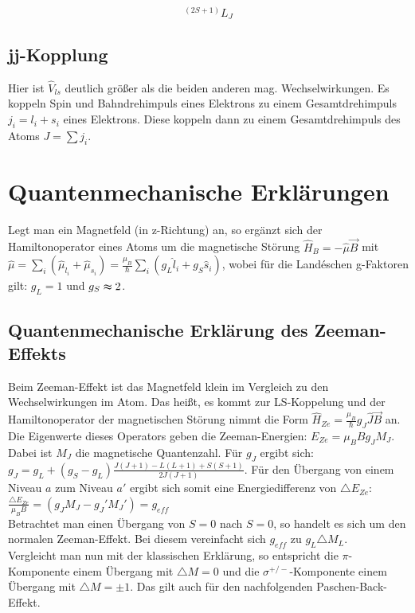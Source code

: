 \documentclass[bigchapter,colorback,accentcolor=tud4b,linedtoc,11pt]{tudreport}
\begin{document}
$$^{(2S+1)}L_{J}$$



\subsection{jj-Kopplung}

Hier ist $\hat{V}_{ls}$ deutlich größer als die beiden anderen mag.
Wechselwirkungen. Es koppeln Spin und Bahndrehimpuls eines Elektrons
zu einem Gesamtdrehimpuls $j_{i}=l_{i}+s_{i}$ eines Elektrons. Diese
koppeln dann zu einem Gesamtdrehimpuls des Atoms $J=\sum j_{i}$.


\section{Quantenmechanische Erklärungen}

Legt man ein Magnetfeld (in z-Richtung) an, so ergänzt sich der Hamiltonoperator
eines Atoms um die magnetische Störung $\hat{H}_{B}=-\hat{\mu}\vec{B}$
mit $\hat{\mu}=\underset{i}{\sum}(\hat{\mu}_{l_{i}}+\hat{\mu}_{s_{i}})=\underset{}{\frac{\mu_{B}}{\hslash}\underset{i}{\sum}(g_{L}\hat{l}_{i}+g_{S}\hat{s}_{i})}$,
wobei für die Landéschen g-Faktoren gilt: $g_{L}=1$ und $g_{S}\thickapprox2$. 


\subsection{Quantenmechanische Erklärung des Zeeman-Effekts}

Beim Zeeman-Effekt ist das Magnetfeld klein im Vergleich zu den Wechselwirkungen
im Atom. Das heißt, es kommt zur LS-Koppelung und der Hamiltonoperator
der magnetischen Störung nimmt die Form $\hat{H}_{Ze}=\frac{\mu_{B}}{\hslash}g_{J}\hat{J}\vec{B}$
an. Die Eigenwerte dieses Operators geben die Zeeman-Energien: $E_{Ze}=\mu_{B}Bg_{J}M_{J}$.
Dabei ist $M_{J}$ die magnetische Quantenzahl. Für $g_{J}$ ergibt
sich: $g_{J}=g_{L}+(g_{S}-g_{L})\frac{J(J+1)-L(L+1)+S(S+1)}{2J(J+1)}$.
Für den Übergang von einem Niveau $a$ zum Niveau $a'$ ergibt sich
somit eine Energiedifferenz von $\triangle E_{Ze}$: $\frac{\triangle E_{Ze}}{\mu_{B}B}=(g_{J}M_{J}-g_{J}'M_{J}')=g_{eff}$\\
Betrachtet man einen Übergang von $S=0$ nach $S=0$, so handelt es
sich um den normalen Zeeman-Effekt. Bei diesem vereinfacht sich $g_{eff}$
zu $g_{L}\triangle M_{L}$.\\
Vergleicht man nun mit der klassischen Erklärung, so entspricht die
$\pi$-Komponente einem Übergang mit $\triangle M=0$ und die $\sigma^{+/-}$-Komponente
einem Übergang mit $\triangle M=\pm1$. Das gilt auch für den nachfolgenden
Paschen-Back-Effekt.
\end{document}
